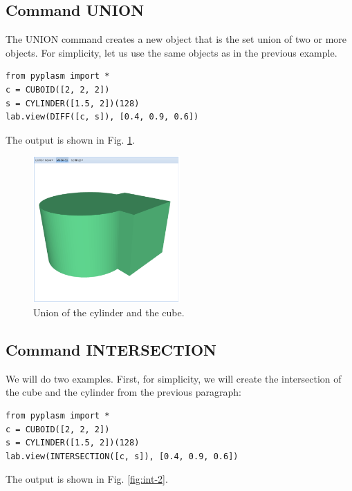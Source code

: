 \documentclass[article,A4,12pt]{llncs}
\begin{document}
\subsection{Command UNION}

The UNION command creates a new object that is the set union 
of two or more objects. For simplicity, let us use the same objects
as in the previous example. 

\begin{verbatim}
from pyplasm import *
c = CUBOID([2, 2, 2])
s = CYLINDER([1.5, 2])(128)
lab.view(DIFF([c, s]), [0.4, 0.9, 0.6]) 
\end{verbatim}
The output is shown in Fig. \ref{fig:union}.


\begin{figure}[!ht]
\begin{center}
\includegraphics[width=0.5\textwidth]{img/union.png}
\end{center}
\vspace{-2mm}
\caption{Union of the cylinder and the cube.}
\label{fig:union}
\end{figure}


\subsection{Command INTERSECTION}

We will do two examples. First, for simplicity, we will create the intersection
of the cube and the cylinder from the previous paragraph:
 
\begin{verbatim}
from pyplasm import *
c = CUBOID([2, 2, 2])
s = CYLINDER([1.5, 2])(128)
lab.view(INTERSECTION([c, s]), [0.4, 0.9, 0.6]) 
\end{verbatim}
The output is shown in Fig. \ref{fig:int-2}.
\end{document}

